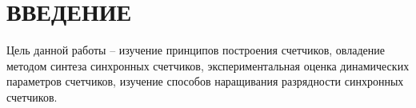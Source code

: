 \section*{ВВЕДЕНИЕ}

Цель данной работы -- изучение принципов построения счетчиков, овладение
методом синтеза синхронных счетчиков, экспериментальная оценка
динамических параметров счетчиков, изучение способов наращивания
разрядности синхронных счетчиков.

\pagebreak